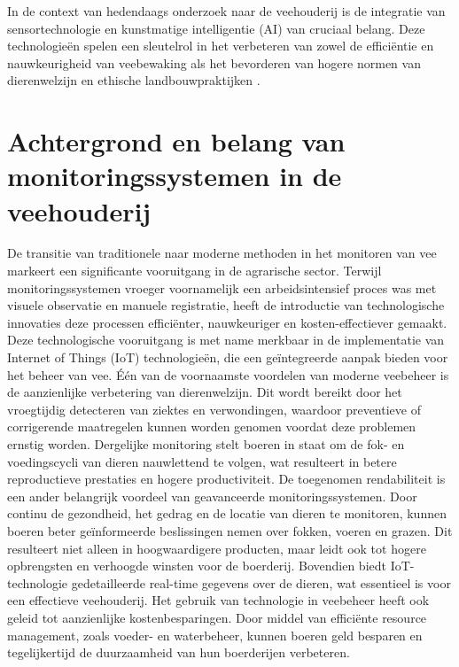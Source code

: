 In de context van hedendaags onderzoek naar de veehouderij is de integratie van sensortechnologie en kunstmatige intelligentie (AI) van cruciaal belang. 
Deze technologieën spelen een sleutelrol in het verbeteren van zowel de efficiëntie en nauwkeurigheid van veebewaking als het bevorderen van hogere normen van dierenwelzijn en ethische landbouwpraktijken \autocite{PastureIo}.
\section{Achtergrond en belang van monitoringssystemen in de veehouderij}
De transitie van traditionele naar moderne methoden in het monitoren van vee markeert een significante vooruitgang in de agrarische sector. Terwijl monitoringssystemen vroeger voornamelijk een arbeidsintensief proces was met visuele observatie en manuele registratie, heeft de introductie van technologische innovaties deze processen efficiënter, nauwkeuriger en kosten-effectiever gemaakt\autocite{ToAgriculture}. Deze technologische vooruitgang is met name merkbaar in de implementatie van Internet of Things (IoT) technologieën, die een geïntegreerde aanpak bieden voor het beheer van vee\autocite{IntuzIoT}.
\newline
Één  van de voornaamste voordelen van moderne veebeheer is de aanzienlijke verbetering van dierenwelzijn. Dit wordt bereikt door het vroegtijdig detecteren van ziektes en verwondingen, waardoor preventieve of corrigerende maatregelen kunnen worden genomen voordat deze problemen ernstig worden. Dergelijke monitoring stelt boeren in staat om de fok- en voedingscycli van dieren nauwlettend te volgen, wat resulteert in betere reproductieve prestaties en hogere productiviteit\autocite{ToAgriculture}.
\newline
De toegenomen rendabiliteit is een ander belangrijk voordeel van geavanceerde monitoringssystemen. Door continu de gezondheid, het gedrag en de locatie van dieren te monitoren, 
kunnen boeren beter geïnformeerde beslissingen nemen over fokken, voeren en grazen. Dit resulteert niet alleen in hoogwaardigere producten, maar leidt ook tot hogere opbrengsten en verhoogde winsten voor de boerderij\autocite{ToAgriculture}. 
Bovendien biedt IoT-technologie gedetailleerde real-time gegevens over de dieren, wat essentieel is voor een effectieve veehouderij\autocite{IntuzIoT}.
\newline
Het gebruik van technologie in veebeheer heeft ook geleid tot aanzienlijke kostenbesparingen. 
Door middel van efficiënte resource management, zoals voeder- en waterbeheer, kunnen boeren geld besparen en tegelijkertijd de duurzaamheid van hun boerderijen verbeteren. 
